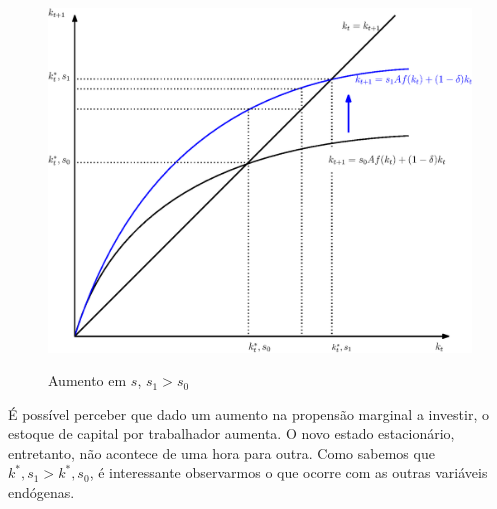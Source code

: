 \documentclass[11pt,a4paper]{article}
\begin{document}
\begin{figure}[!h]
\centering
\caption{Aumento em $s$, $s_1 > s_0$} \vspace{2ex}
\includegraphics[scale=.5]{solow03.eps}
\label{fig:convergencia2}
\end{figure}

É possível perceber que dado um aumento na propensão marginal a investir, o estoque de capital por trabalhador aumenta. O novo estado estacionário, entretanto, não acontece de uma hora para outra. Como sabemos que $k^\ast , s_1 > k^\ast , s_0$, é interessante observarmos o que ocorre com as outras variáveis endógenas. 
\end{document}
